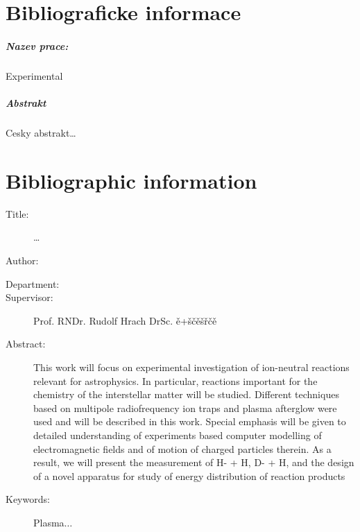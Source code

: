\begingroup
\let\clearpage\relax
\let\cleardoublepage\relax
\let\cleardoublepage\relax



\chapter*{Bibliograficke informace}


\paragraph{Nazev prace: }

Experimental


\paragraph{Abstrakt}

Cesky abstrakt\dots

\vfill{}




\chapter*{Bibliographic information}
\begin{description}
\item [{Title:}] \myTitle\dots
\item [{Author:}] \foreignlanguage{english}{\myName}
\item [{Department:}] \myDepartment
\item [{Supervisor:}] Prof. RNDr. Rudolf Hrach DrSc. ě+ščěšřčě
\item [{Abstract:}] This work will focus on experimental investigation
of ion-neutral reactions relevant for astrophysics. In particular,
reactions important for the chemistry of the interstellar matter will
be studied. Different techniques based on multipole radiofrequency
ion traps and plasma afterglow were used and will be described in
this work. Special emphasis will be given to detailed understanding
of experiments based computer modelling of electromagnetic fields
and of motion of charged particles therein. As a result, we will present
the measurement of H- + H, D- + H, and the design of a novel apparatus
for study of energy distribution of reaction products
\item [{Keywords:}] Plasma$\ldots$
\end{description}
\vfill{}

\endgroup			

\vfill
